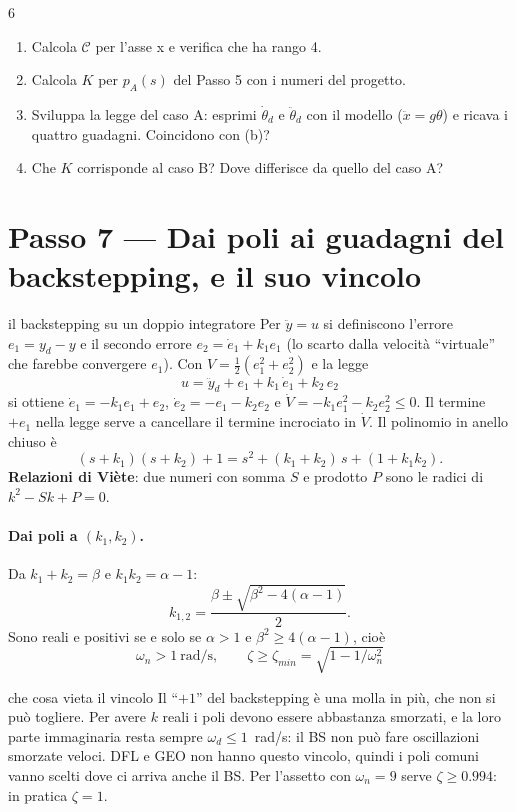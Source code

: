 \documentclass[11pt,a4paper]{article}
\newcommand{\rads}{\ \mathrm{rad/s}}
\begin{document}
\begin{esercizio}{6}
\begin{enumerate}[label=(\alph*)]
  \item Calcola $\mathcal{C}$ per l'asse x e verifica che ha rango 4.
  \item Calcola $K$ per $p_A(s)$ del Passo 5 con i numeri del progetto.
  \item Sviluppa la legge del caso A: esprimi $\dot\theta_d$ e $\ddot\theta_d$ con il modello ($\ddot x = g\theta$) e ricava i quattro guadagni. Coincidono con (b)?
  \item Che $K$ corrisponde al caso B? Dove differisce da quello del caso A?
\end{enumerate}
\end{esercizio}

\section{Passo 7 --- Dai poli ai guadagni del backstepping, e il suo vincolo}

\begin{teoria}{il backstepping su un doppio integratore}
Per $\ddot y = u$ si definiscono l'errore $e_1 = y_d - y$ e il secondo errore $e_2 = \dot e_1 + k_1 e_1$ (lo scarto dalla velocità ``virtuale'' che farebbe convergere $e_1$). Con $V = \tfrac12(e_1^2 + e_2^2)$ e la legge
\[
u = \ddot y_d + e_1 + k_1\,\dot e_1 + k_2\,e_2
\]
si ottiene $\dot e_1 = -k_1 e_1 + e_2$, $\dot e_2 = -e_1 - k_2 e_2$ e $\dot V = -k_1 e_1^2 - k_2 e_2^2 \le 0$. Il termine $+e_1$ nella legge serve a cancellare il termine incrociato in $\dot V$. Il polinomio in anello chiuso è
\[
(s + k_1)(s + k_2) + 1 = s^2 + (k_1 + k_2)\,s + (1 + k_1 k_2).
\]
\textbf{Relazioni di Viète}: due numeri con somma $S$ e prodotto $P$ sono le radici di $k^2 - Sk + P = 0$.
\end{teoria}

\paragraph{Dai poli a $(k_1, k_2)$.} Da $k_1 + k_2 = \beta$ e $k_1 k_2 = \alpha - 1$:
\[
k_{1,2} = \frac{\beta \pm \sqrt{\beta^2 - 4(\alpha - 1)}}{2}.
\]
Sono reali e positivi se e solo se $\alpha > 1$ e $\beta^2 \ge 4(\alpha - 1)$, cioè
\[
\boxed{\ \omega_n > 1 \rads, \qquad \zeta \ge \zeta_{min} = \sqrt{1 - 1/\omega_n^2}\ }
\]

\begin{fisica}{che cosa vieta il vincolo}
Il ``$+1$'' del backstepping è una molla in più, che non si può togliere. Per avere $k$ reali i poli devono essere abbastanza smorzati, e la loro parte immaginaria resta sempre $\omega_d \le 1$~rad/s: il BS non può fare oscillazioni smorzate veloci. DFL e GEO non hanno questo vincolo, quindi i poli comuni vanno scelti dove ci arriva anche il BS. Per l'assetto con $\omega_n = 9$ serve $\zeta \ge 0.994$: in pratica $\zeta = 1$.
\end{fisica}
\end{document}

